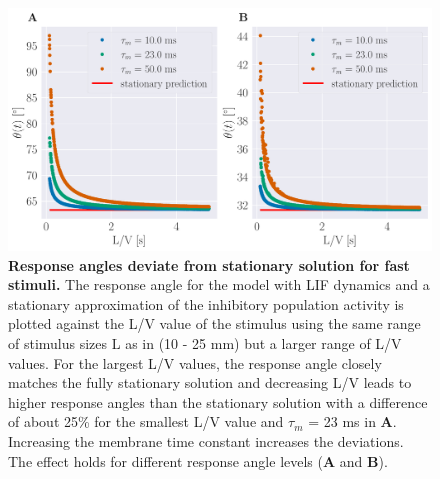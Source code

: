 \documentclass[a4paper,10pt,hidelinks]{scrreprt}
\begin{document}
    \begin{figure}[H]
    	\begin{center}
			\includegraphics[width=\textwidth]{figure_station_inh_resp_angle.pdf}
    	\end{center}
    	\caption{\textbf{Response angles deviate from stationary solution for fast stimuli.} The response angle for the model with LIF dynamics and a stationary approximation of the inhibitory population activity is plotted against the L/V value of the stimulus using the same range of stimulus sizes L as in \cite{Bhattacharyya2017} (10 - 25 mm) but a larger range of L/V values. For the largest L/V values, the response angle closely matches the fully stationary solution and decreasing L/V leads to higher response angles than the stationary solution with a difference of about 25\% for the smallest L/V value and $\tau_{m}$ = 23 ms in \textbf{A}. Increasing the membrane time constant increases the deviations. The effect holds for different response angle levels (\textbf{A} and \textbf{B}).}
    	\label{fig:station_inh_resp_angle}
    \end{figure}
    
\end{document}
